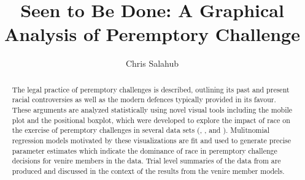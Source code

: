 \documentclass[12pt]{article}
\title{Seen to Be Done: A Graphical Analysis of Peremptory Challenge}
\author{Chris Salahub}
\begin{document}
\maketitle

\begin{abstract}
The legal practice of peremptory challenges is described, outlining its past and present racial controversies as well as the
modern defences typically provided in its favour. These arguments are analyzed statistically using novel visual tools including
the mobile plot and the positional boxplot, which were developed to explore the impact of race on the exercise of peremptory
challenges in several data sets (\cite{JurySunshineProj}, \cite{StubbornLegacy}, and \cite{PerempChalMurder}). Mulitnomial
regression models motivated by these visualizations are fit and used to generate precise parameter estimates which indicate the
dominance of race in peremptory challenge decisions for venire members in the \cite{JurySunshineProj} data. Trial level
summaries of the data from \cite{JurySunshineProj} are produced and discussed in the context of the results from the venire
member models.
\end{abstract}
 





 




\end{document}
